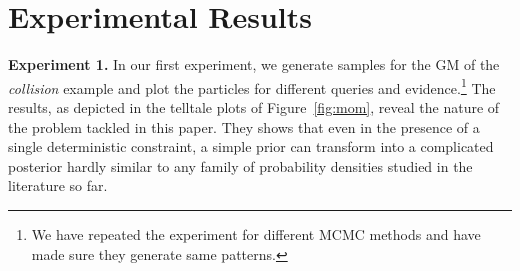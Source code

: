 \documentclass[letterpaper]{article}
\begin{document}

\section{Experimental Results}
\textbf{Experiment 1.} In our first experiment, we generate samples for the GM of the \emph{collision} example and 
plot the particles for different queries and evidence.\footnote{We have repeated the experiment for different 
MCMC methods and have made sure they generate same patterns.}
The results, as depicted in the telltale plots of Figure~\ref{fig:mom}, reveal the nature of the problem tackled in this paper.
They shows that even in the presence of a single deterministic constraint, 
a simple prior can transform into a complicated posterior hardly similar to any family of 
probability densities studied in the literature so far.
\end{document}
